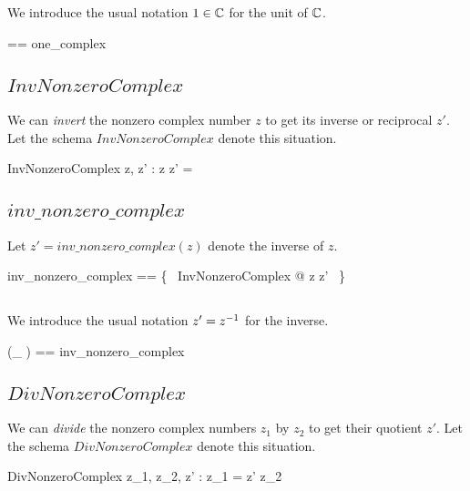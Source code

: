 \documentclass[11pt, oneside]{article}
\begin{document}
We introduce the usual notation $1 \in \mathbb{C}$ for the unit of $\mathbb{C}$.

\begin{zed}
	\oneC == one\_complex
\end{zed}

\subsection{$InvNonzeroComplex$}

We can \textit{invert}
the nonzero complex number $z$ to get its inverse or reciprocal $z'$.
Let the schema $InvNonzeroComplex$ denote this situation.

\begin{schema}{InvNonzeroComplex}
	z, z' : \Cnz
\where
	z \mulCnz z' = \oneC
\end{schema}

\subsection{$inv\_nonzero\_complex$}

Let $z' = inv\_nonzero\_complex(z)$ denote the inverse of $z$.

\begin{zed}
	inv\_nonzero\_complex == \{~ InvNonzeroComplex @ z \mapsto z' ~\}
\end{zed}

\subsection{}

We introduce the usual notation $z' = z ^{-1}$ for the inverse.

\begin{zed}
	(\_ \invCnz) == inv\_nonzero\_complex
\end{zed}

\subsection{$DivNonzeroComplex$}

We can \textit{divide} the nonzero complex numbers $z_1$ by $z_2$ to get their quotient $z'$.
Let the schema $DivNonzeroComplex$ denote this situation.

\begin{schema}{DivNonzeroComplex}
	z_1, z_2, z' : \Cnz
\where
	z_1 = z' \mulCnz z_2
\end{schema}
\end{document}
